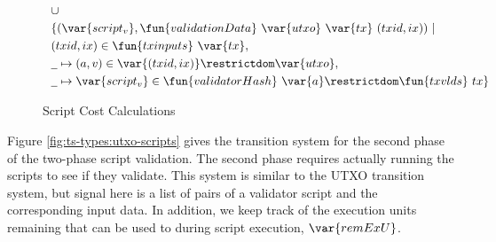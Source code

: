 \begin{figure}[htb]
\begin{align*}
    & ~~\cup~ \\
    & ~~\{ (\var{script_v},\fun{validationData}~\var{utxo}~\var{tx}~
      (txid,ix)) ~\vert \\
    & ~~(txid,ix) \in \fun{txinputs}~\var{tx}, \\
    & ~~ \wcard \mapsto (a,v) \in \var{(txid,ix)}\restrictdom\var{utxo}, \\
    & ~~\wcard\mapsto \var{script_v}\in
     \fun{validatorHash}~\var{a}\restrictdom\fun{txvlds}~{tx}\}
  \end{align*}
  \caption{Script Cost Calculations}
  \label{fig:functions:script2}
\end{figure}

Figure \ref{fig:ts-types:utxo-scripts} gives the transition system for the second phase of
the two-phase script validation. The second phase requires actually running
the scripts to see if they validate. This system is similar to
the UTXO transition system, but signal here is a list of pairs of a validator
script and the corresponding input data. In addition, we keep track of the
execution units remaining that can be used to during script execution, $\var{remExU}$.

